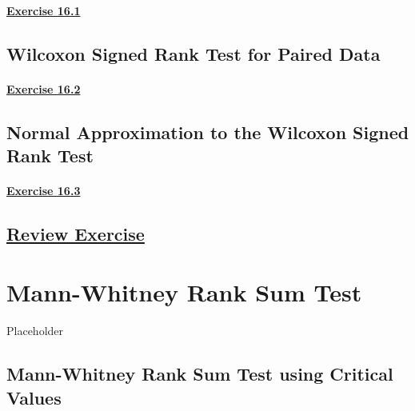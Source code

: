 \documentclass[
  11pt,
]{book}
\begin{document}
\subsubsection*{\texorpdfstring{\hyperref[ex161a]{Exercise 16.1}}{Exercise 16.1}}\label{exercise-16.1}

\section{Wilcoxon Signed Rank Test for Paired Data}\label{wilcoxon-signed-rank-test-for-paired-data}

\subsubsection*{\texorpdfstring{\hyperref[ex162a]{Exercise 16.2}}{Exercise 16.2}}\label{exercise-16.2}

\section{Normal Approximation to the Wilcoxon Signed Rank Test}\label{normal-approximation-to-the-wilcoxon-signed-rank-test}

\subsubsection*{\texorpdfstring{\hyperref[ex163a]{Exercise 16.3}}{Exercise 16.3}}\label{exercise-16.3}

\section*{\texorpdfstring{\hyperref[re16a]{Review Exercise}}{Review Exercise}}\label{review-exercise-15}

\chapter{Mann-Whitney Rank Sum Test}\label{mann-whitney-rank-sum-test}

Placeholder

\section{Mann-Whitney Rank Sum Test using Critical Values}\label{mann-whitney-rank-sum-test-using-critical-values}
\end{document}
